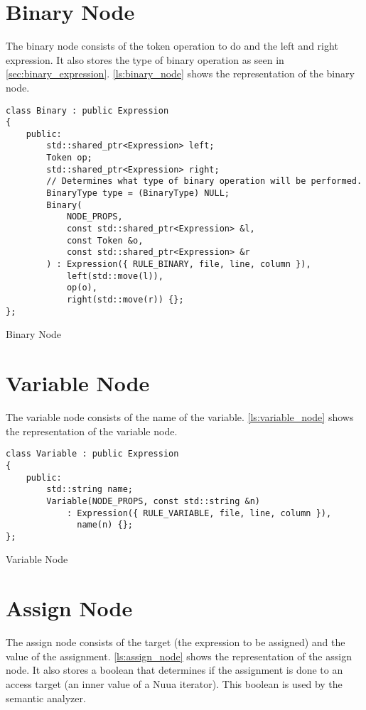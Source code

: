 \section{Binary Node}

The binary node consists of the token operation to do and the left and right expression. It also stores the type of binary operation as seen in
\autoref{sec:binary_expression}. \autoref{ls:binary_node} shows the representation of the binary node.

\begin{listing}[H]
\begin{verbatim}
class Binary : public Expression
{
    public:
        std::shared_ptr<Expression> left;
        Token op;
        std::shared_ptr<Expression> right;
        // Determines what type of binary operation will be performed.
        BinaryType type = (BinaryType) NULL;
        Binary(
            NODE_PROPS,
            const std::shared_ptr<Expression> &l,
            const Token &o,
            const std::shared_ptr<Expression> &r
        ) : Expression({ RULE_BINARY, file, line, column }),
            left(std::move(l)),
            op(o),
            right(std::move(r)) {};
};
\end{verbatim}
\caption{Binary Node}
\label{ls:binary_node}
\end{listing}

\section{Variable Node}

The variable node consists of the name of the variable. \autoref{ls:variable_node} shows the representation of the variable node.

\begin{listing}[H]
\begin{verbatim}
class Variable : public Expression
{
    public:
        std::string name;
        Variable(NODE_PROPS, const std::string &n)
            : Expression({ RULE_VARIABLE, file, line, column }),
              name(n) {};
};
\end{verbatim}
\caption{Variable Node}
\label{ls:variable_node}
\end{listing}

\section{Assign Node}

The assign node consists of the target (the expression to be assigned) and the value of the assignment.
\autoref{ls:assign_node} shows the representation of the assign node. It also stores a boolean that determines if
the assignment is done to an access target (an inner value of a Nuua iterator). This boolean is used by the semantic analyzer.

